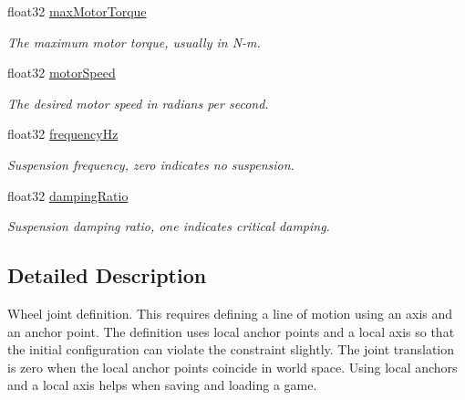 \begin{DoxyCompactItemize}
float32 \hyperlink{structb2_wheel_joint_def_ab658ce0fae40c6de09133659f7ffb829}{max\+Motor\+Torque}
\begin{DoxyCompactList}\small\item\em The maximum motor torque, usually in N-\/m. \end{DoxyCompactList}\item 
\mbox{\label{structb2_wheel_joint_def_a7248e25f2ca6b6c2a5f7079ce16e7748}} 
float32 \hyperlink{structb2_wheel_joint_def_a7248e25f2ca6b6c2a5f7079ce16e7748}{motor\+Speed}
\begin{DoxyCompactList}\small\item\em The desired motor speed in radians per second. \end{DoxyCompactList}\item 
\mbox{\label{structb2_wheel_joint_def_acf3540f46eaf3bc91426386939bd37b1}} 
float32 \hyperlink{structb2_wheel_joint_def_acf3540f46eaf3bc91426386939bd37b1}{frequency\+Hz}
\begin{DoxyCompactList}\small\item\em Suspension frequency, zero indicates no suspension. \end{DoxyCompactList}\item 
\mbox{\label{structb2_wheel_joint_def_a9976584bfee18b46dec355764797ce54}} 
float32 \hyperlink{structb2_wheel_joint_def_a9976584bfee18b46dec355764797ce54}{damping\+Ratio}
\begin{DoxyCompactList}\small\item\em Suspension damping ratio, one indicates critical damping. \end{DoxyCompactList}\end{DoxyCompactItemize}


\subsection{Detailed Description}
Wheel joint definition. This requires defining a line of motion using an axis and an anchor point. The definition uses local anchor points and a local axis so that the initial configuration can violate the constraint slightly. The joint translation is zero when the local anchor points coincide in world space. Using local anchors and a local axis helps when saving and loading a game. 

